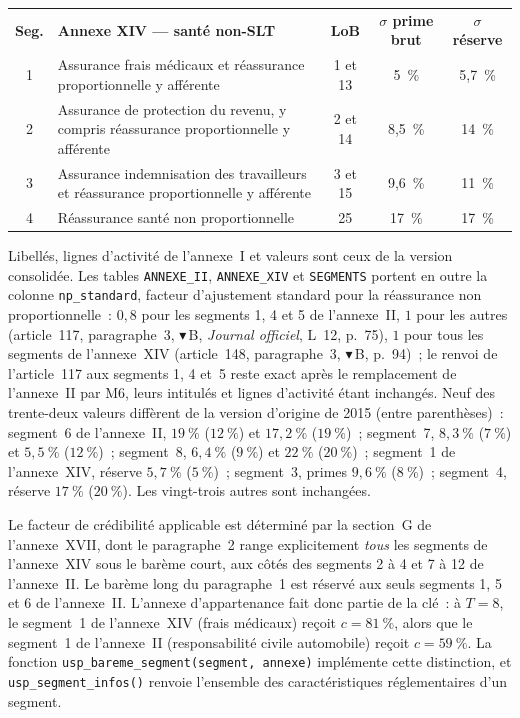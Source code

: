 \documentclass[a4paper,11pt]{article}
\newcommand{\code}[1]{\texttt{\small #1}}
\begin{document}
\begin{center}
\small
{}
\begin{tabular}{@{}cp{8.0cm}ccc@{}}
\rowcolor{tableheader}
\textcolor{financeblue}{\textbf{Seg.}} &
\textcolor{financeblue}{\textbf{Annexe XIV --- santé non-SLT}} &
\textcolor{financeblue}{\textbf{LoB}} &
\textcolor{financeblue}{\textbf{$\sigma$ prime brut}} &
\textcolor{financeblue}{\textbf{$\sigma$ réserve}} \\
1 & Assurance frais médicaux et réassurance proportionnelle y afférente & 1 et 13 & 5~\% & 5,7~\% \\
2 & Assurance de protection du revenu, y compris réassurance proportionnelle y afférente & 2 et 14 & 8,5~\% & 14~\% \\
3 & Assurance indemnisation des travailleurs et réassurance proportionnelle y afférente & 3 et 15 & 9,6~\% & 11~\% \\
4 & Réassurance santé non proportionnelle & 25 & 17~\% & 17~\% \\
\end{tabular}
\end{center}

\noindent
Libellés, lignes d'activité de l'annexe~I et valeurs sont ceux de la version
consolidée. Les tables \code{ANNEXE\_II}, \code{ANNEXE\_XIV} et \code{SEGMENTS} portent en
outre la colonne \code{np\_standard}, facteur d'ajustement standard pour la réassurance non
proportionnelle~: $0{,}8$ pour les segments 1, 4 et 5 de l'annexe~II, $1$ pour les autres
(article~117, paragraphe~3, $\blacktriangledown$\,B, \emph{Journal officiel}, L~12,
p.~75), $1$ pour tous les segments de l'annexe~XIV (article~148, paragraphe~3,
$\blacktriangledown$\,B, p.~94)~; le renvoi de l'article~117 aux segments 1, 4 et~5 reste exact
après le remplacement de l'annexe~II par M6, leurs intitulés et lignes d'activité étant
inchangés. Neuf des trente-deux valeurs diffèrent de la version d'origine de
2015 (entre parenthèses)~: segment~6 de l'annexe~II, $19~\%$ ($12~\%$) et
$17{,}2~\%$ ($19~\%$)~; segment~7, $8{,}3~\%$ ($7~\%$) et $5{,}5~\%$
($12~\%$)~; segment~8, $6{,}4~\%$ ($9~\%$) et $22~\%$ ($20~\%$)~; segment~1 de
l'annexe~XIV, réserve $5{,}7~\%$ ($5~\%$)~; segment~3, primes $9{,}6~\%$
($8~\%$)~; segment~4, réserve $17~\%$ ($20~\%$). Les vingt-trois autres sont
inchangées.

\noindent
Le facteur de crédibilité applicable est déterminé par la section~G de
l'annexe~XVII, dont le paragraphe~2 range explicitement \emph{tous} les segments
de l'annexe~XIV sous le barème court, aux côtés des segments 2 à 4 et 7 à 12 de
l'annexe~II. Le barème long du paragraphe~1 est réservé aux seuls segments 1, 5
et 6 de l'annexe~II. L'annexe d'appartenance fait donc partie de la clé~: à
$T = 8$, le segment~1 de l'annexe~XIV (frais médicaux) reçoit $c = 81~\%$, alors
que le segment~1 de l'annexe~II (responsabilité civile automobile) reçoit
$c = 59~\%$. La fonction \code{usp\_bareme\_segment(segment, annexe)} implémente
cette distinction, et \code{usp\_segment\_infos()} renvoie l'ensemble des
caractéristiques réglementaires d'un segment.
\end{document}

